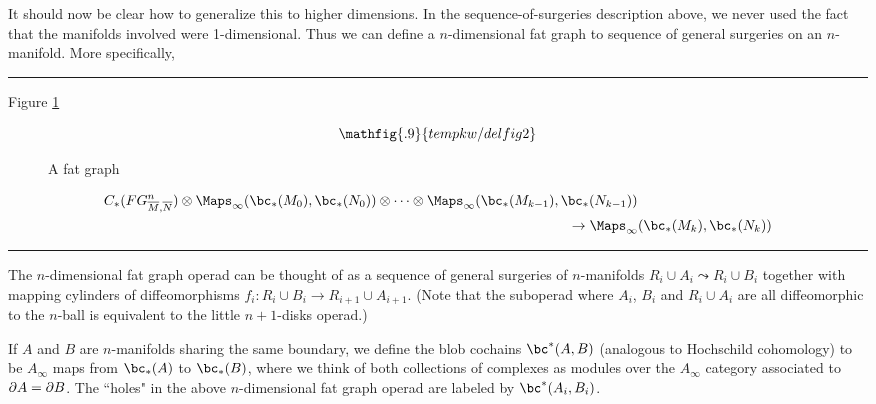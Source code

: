 It should now be clear how to generalize this to higher dimensions.
In the sequence-of-surgeries description above, we never used the fact that the manifolds
involved were 1-dimensional.
Thus we can define a $n$-dimensional fat graph to sequence of general surgeries
on an $n$-manifold.
More specifically, 


\medskip
\hrule\medskip


Figure \ref{delfig2}
\begin{figure}[!ht]
$$\mathfig{.9}{tempkw/delfig2}$$
\caption{A fat graph}\label{delfig2}\end{figure}


\begin{eqnarray*}
	C_*(FG^n_{\overline{M}, \overline{N}})\otimes \mapinf(\bc_*(M_0), \bc_*(N_0))\otimes\cdots\otimes 
\mapinf(\bc_*(M_{k-1}), \bc_*(N_{k-1})) & \\
	& \hspace{-5em}\to  \mapinf(\bc_*(M_k), \bc_*(N_k))
\end{eqnarray*}

\medskip
\hrule\medskip

The $n$-dimensional fat graph operad can be thought of as a sequence of general surgeries
of $n$-manifolds
$R_i \cup A_i \leadsto R_i \cup B_i$ together with mapping cylinders of diffeomorphisms
$f_i: R_i\cup B_i \to R_{i+1}\cup A_{i+1}$.
(Note that the suboperad where $A_i$, $B_i$ and $R_i\cup A_i$ are all diffeomorphic to 
the $n$-ball is equivalent to the little $n{+}1$-disks operad.)

If $A$ and $B$ are $n$-manifolds sharing the same boundary, we define
the blob cochains $\bc^*(A, B)$ (analogous to Hochschild cohomology) to be
$A_\infty$ maps from $\bc_*(A)$ to $\bc_*(B)$, where we think of both
collections of complexes as modules over the $A_\infty$ category associated to $\partial A = \partial B$.
The ``holes" in the above 
$n$-dimensional fat graph operad are labeled by $\bc^*(A_i, B_i)$.

